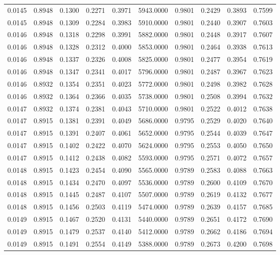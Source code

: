 \begin{tabular}{rrrrrrrrrr}
0.0145 & 0.8948 & 0.1300 & 0.2271 & 0.3971 & 5943.0000 & 0.9801 & 0.2429 & 0.3893 & 0.7599 \\
0.0145 & 0.8948 & 0.1309 & 0.2284 & 0.3983 & 5910.0000 & 0.9801 & 0.2440 & 0.3907 & 0.7603 \\
0.0146 & 0.8948 & 0.1318 & 0.2298 & 0.3991 & 5882.0000 & 0.9801 & 0.2448 & 0.3917 & 0.7607 \\
0.0146 & 0.8948 & 0.1328 & 0.2312 & 0.4000 & 5853.0000 & 0.9801 & 0.2464 & 0.3938 & 0.7613 \\
0.0146 & 0.8948 & 0.1337 & 0.2326 & 0.4008 & 5825.0000 & 0.9801 & 0.2477 & 0.3954 & 0.7619 \\
0.0146 & 0.8948 & 0.1347 & 0.2341 & 0.4017 & 5796.0000 & 0.9801 & 0.2487 & 0.3967 & 0.7623 \\
0.0146 & 0.8932 & 0.1354 & 0.2351 & 0.4023 & 5772.0000 & 0.9801 & 0.2498 & 0.3982 & 0.7628 \\
0.0146 & 0.8932 & 0.1364 & 0.2366 & 0.4035 & 5738.0000 & 0.9801 & 0.2508 & 0.3994 & 0.7632 \\
0.0147 & 0.8932 & 0.1374 & 0.2381 & 0.4043 & 5710.0000 & 0.9801 & 0.2522 & 0.4012 & 0.7638 \\
0.0147 & 0.8915 & 0.1381 & 0.2391 & 0.4049 & 5686.0000 & 0.9795 & 0.2529 & 0.4020 & 0.7640 \\
0.0147 & 0.8915 & 0.1391 & 0.2407 & 0.4061 & 5652.0000 & 0.9795 & 0.2544 & 0.4039 & 0.7647 \\
0.0147 & 0.8915 & 0.1402 & 0.2422 & 0.4070 & 5624.0000 & 0.9795 & 0.2553 & 0.4050 & 0.7650 \\
0.0147 & 0.8915 & 0.1412 & 0.2438 & 0.4082 & 5593.0000 & 0.9795 & 0.2571 & 0.4072 & 0.7657 \\
0.0148 & 0.8915 & 0.1423 & 0.2454 & 0.4090 & 5565.0000 & 0.9789 & 0.2583 & 0.4088 & 0.7663 \\
0.0148 & 0.8915 & 0.1434 & 0.2470 & 0.4097 & 5536.0000 & 0.9789 & 0.2600 & 0.4109 & 0.7670 \\
0.0148 & 0.8915 & 0.1445 & 0.2487 & 0.4107 & 5507.0000 & 0.9789 & 0.2619 & 0.4132 & 0.7677 \\
0.0148 & 0.8915 & 0.1456 & 0.2503 & 0.4119 & 5474.0000 & 0.9789 & 0.2639 & 0.4157 & 0.7685 \\
0.0149 & 0.8915 & 0.1467 & 0.2520 & 0.4131 & 5440.0000 & 0.9789 & 0.2651 & 0.4172 & 0.7690 \\
0.0149 & 0.8915 & 0.1479 & 0.2537 & 0.4140 & 5412.0000 & 0.9789 & 0.2662 & 0.4186 & 0.7694 \\
0.0149 & 0.8915 & 0.1491 & 0.2554 & 0.4149 & 5388.0000 & 0.9789 & 0.2673 & 0.4200 & 0.7698 \\

\end{tabular}
